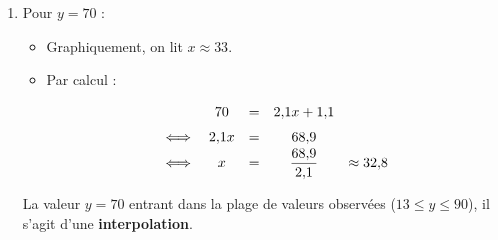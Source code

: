 \begin{methode}
\begin{correction}
\begin{enumerate}
			\item Pour $y = 70$ :
			      \begin{itemize}
				      \item Graphiquement, on lit $x \approx 33$.
				      \item Par calcul :
				            \[
					            \def\arraystretch{1.5}
					            \begin{array}{rcccl}
						                 & 70     & = & 2{,}1x + 1{,}1        &                \\
						            \iff & 2{,}1x & = & 68{,}9                &                \\
						            \iff & x      & = & \dfrac{68{,}9}{2{,}1} & \approx 32{,}8
					            \end{array}
				            \]
			      \end{itemize}
			      La valeur $y=70$ entrant dans la plage de valeurs observées ($13 \leqslant y \leqslant 90$), il s'agit d'une \textbf{interpolation}.
		\end{enumerate}
	\end{correction}
\end{methode}

